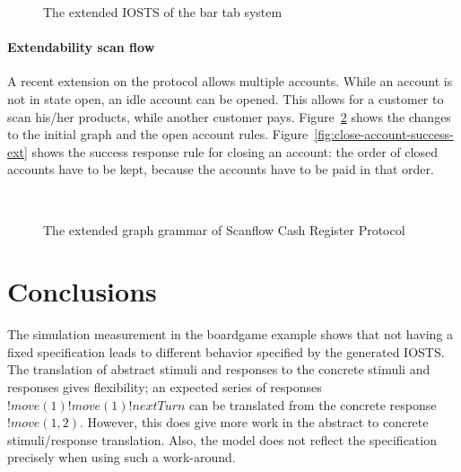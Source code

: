 \begin{figure}[ht]
  \begin{center}
    
  \end{center}
  \caption{The extended IOSTS of the bar tab system}
  \label{fig:sts-bartab-extended}
\end{figure}

\paragraph*{Extendability scan flow}
A recent extension on the protocol allows multiple accounts. While an account is not in state open, an idle account can be opened. This allows for a customer to scan his/her products, while another customer pays. Figure~\ref{fig:gg-fwgc-extended} shows the changes to the initial graph and the open account rules. Figure~\ref{fig:close-account-success-ext} shows the success response rule for closing an account: the order of closed accounts have to be kept, because the accounts have to be paid in that order.

\begin{figure}[ht]
  \begin{center}
    \hspace{20px}
    \\
    \hspace{20px}
  \end{center}
  \caption{The extended graph grammar of Scanflow Cash Register Protocol}
  \label{fig:gg-fwgc-extended}
\end{figure}

\section{Conclusions}
The simulation measurement in the boardgame example shows that not having a fixed specification leads to different behavior specified by the generated IOSTS. The translation of abstract stimuli and responses to the concrete stimuli and responses gives flexibility; an expected series of responses $!move(1) !move(1) !nextTurn$ can be translated from the concrete response $!move(1,2)$. However, this does give more work in the abstract to concrete stimuli/response translation. Also, the model does not reflect the specification precisely when using such a work-around.

